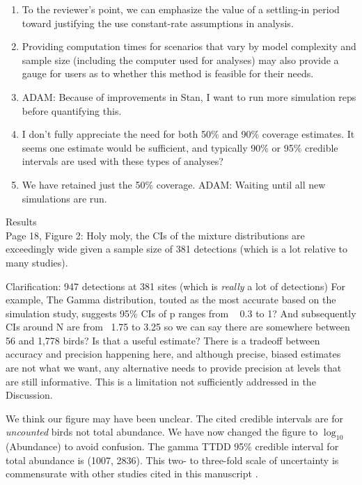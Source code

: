 \documentclass[12pt]{article}
\renewenvironment{quote}  %
              {\list{}{\rightmargin\leftmargin}\normalfont%
               \item\relax}
              {\endlist}
\newcommand{\adam}[1]{{\color{blue} ADAM: #1}}
\begin{document}
\begin{enumerate}
\begin{quote}
{To the reviewer's point, we can emphasize the value of a settling-in period toward justifying the use constant-rate assumptions in analysis.}
\end{quote}
\item Providing computation times for scenarios that vary by model complexity and sample size (including the computer used for analyses) may also provide a gauge for users as to whether this method is feasible for their needs.
\begin{quote}
\adam{Because of improvements in Stan, I want to run more simulation reps before quantifying this.}
\end{quote}
\item I don’t fully appreciate the need for both 50\% and 90\% coverage estimates.  It seems one estimate would be sufficient, and typically 90\% or 95\% credible intervals are used with these types of analyses?
\begin{quote}
We have retained just the 50\% coverage.
\adam{Waiting until all new simulations are run.}
\end{quote}
\end{enumerate}

Results\\
Page 18, Figure 2:  Holy moly, the CIs of the mixture distributions are exceedingly wide given a sample size of 381 detections (which is a lot relative to many studies).
\begin{quote} Clarification: 947 detections at 381 sites (which is \textit{really} a lot of detections)\end{quote}
For example, The Gamma distribution, touted as the most accurate based on the simulation study, suggests 95\% CIs of p ranges from ~ 0.3 to 1?  And subsequently CIs around N are from ~1.75 to 3.25 so we can say there are somewhere between 56 and 1,778  birds?
Is that a useful estimate?  There is a tradeoff between accuracy and precision happening here, and although precise, biased estimates are not what we want, any alternative needs to provide precision at levels that are still informative.  This is a limitation not sufficiently addressed in the Discussion.
\begin{quote} 
We think our figure may have been unclear.
The cited credible intervals are for \textit{uncounted} birds not total abundance.
We have now changed the figure to $\log_{10}$(Abundance) to avoid confusion.
The gamma TTDD 95\% credible interval for total abundance is (1007, 2836).
This two- to three-fold scale of uncertainty is commensurate with other studies cited in this manuscript \citep{Diefenbach2007, Reidy2011, Solymos2013, Amundson2014}.
\end{quote}
\end{document}
